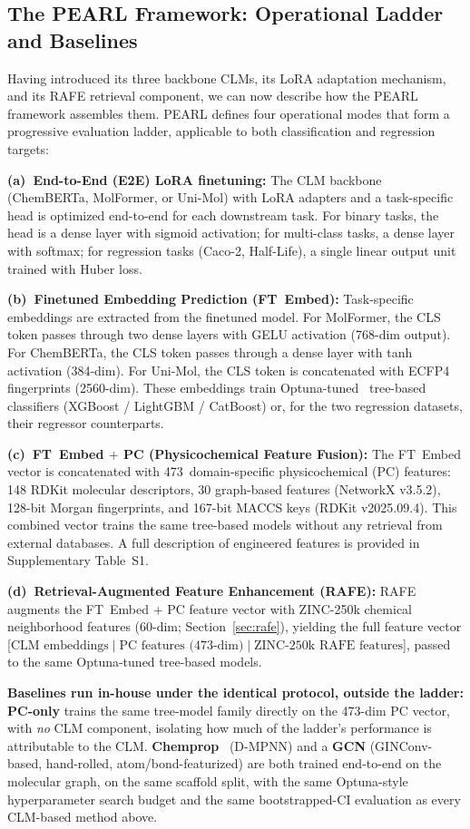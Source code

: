 \documentclass[pdflatex,sn-mathphys-num,Numbered]{sn-jnl}%
\begin{document}
\subsection{The PEARL Framework: Operational Ladder and Baselines}\label{sec:pearl_ladder}
Having introduced its three backbone CLMs, its LoRA adaptation mechanism, and its RAFE retrieval component, we can now describe how the PEARL framework assembles them. PEARL defines four operational modes that form a progressive evaluation ladder, applicable to both classification and regression targets:

\textbf{(a)~End-to-End (E2E) LoRA finetuning:} The CLM backbone (ChemBERTa, MolFormer, or Uni-Mol) with LoRA adapters and a task-specific head is optimized end-to-end for each downstream task. For binary tasks, the head is a dense layer with sigmoid activation; for multi-class tasks, a dense layer with softmax; for regression tasks (Caco-2, Half-Life), a single linear output unit trained with Huber loss.

\textbf{(b)~Finetuned Embedding Prediction (FT~Embed):} Task-specific embeddings are extracted from the finetuned model. For MolFormer, the CLS token passes through two dense layers with GELU activation (768-dim output). For ChemBERTa, the CLS token passes through a dense layer with tanh activation (384-dim). For Uni-Mol, the CLS token is concatenated with ECFP4 fingerprints (2560-dim). These embeddings train Optuna-tuned~\cite{akiba2019optuna} tree-based classifiers (XGBoost / LightGBM / CatBoost) or, for the two regression datasets, their regressor counterparts.

\textbf{(c)~FT~Embed $+$ PC (Physicochemical Feature Fusion):} The FT~Embed vector is concatenated with 473~domain-specific physicochemical (PC) features: 148 RDKit molecular descriptors, 30 graph-based features (NetworkX v3.5.2), 128-bit Morgan fingerprints, and 167-bit MACCS keys (RDKit v2025.09.4). This combined vector trains the same tree-based models without any retrieval from external databases. A full description of engineered features is provided in Supplementary Table~S1.

\textbf{(d)~Retrieval-Augmented Feature Enhancement (RAFE):} RAFE augments the FT~Embed $+$ PC feature vector with ZINC-250k chemical neighborhood features (60-dim; Section~\ref{sec:rafe}), yielding the full feature vector [$\text{CLM embeddings} \mid \text{PC features (473-dim)} \mid \text{ZINC-250k RAFE features}$], passed to the same Optuna-tuned tree-based models.

\textbf{Baselines run in-house under the identical protocol, outside the ladder:} \textbf{PC-only} trains the same tree-model family directly on the 473-dim PC vector, with \emph{no} CLM component, isolating how much of the ladder's performance is attributable to the CLM. \textbf{Chemprop}~\cite{yang2019chemprop} (D-MPNN) and a \textbf{GCN} (GINConv-based, hand-rolled, atom/bond-featurized) are both trained end-to-end on the molecular graph, on the same scaffold split, with the same Optuna-style hyperparameter search budget and the same bootstrapped-CI evaluation as every CLM-based method above.
\end{document}
